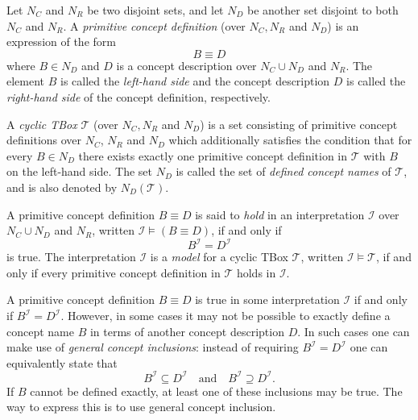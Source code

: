\begin{Definition}
  \label{def:primitive-concept-definitions-cyclic-TBoxes}
  Let $N_C$ and $N_R$ be two disjoint sets, and let $N_D$ be another set disjoint to both
  $N_C$ and $N_R$.  A \emph{primitive concept definition} (over $N_C, N_R$ and $N_D$) is
  an expression of the form
  \begin{equation*}
    B \equiv D
  \end{equation*}
  where $B \in N_D$ and $D$ is a concept description over $N_C \cup N_D$ and $N_R$.  The
  element $B$ is called the \emph{left-hand side} and the concept description $D$ is
  called the \emph{right-hand side} of the concept definition, respectively.

  A \emph{cyclic TBox} $\mathcal{T}$ (over $N_C, N_R$ and $N_D$) is a set consisting of
  primitive concept definitions over $N_C$, $N_R$ and $N_D$ which additionally satisfies
  the condition that for every $B \in N_D$ there exists exactly one primitive concept
  definition in $\mathcal{T}$ with $B$ on the left-hand side.  The set $N_D$ is called the
  set of \emph{defined concept names} of $\mathcal{T}$, and is also denoted by
  $N_D(\mathcal{T})$.

  A primitive concept definition $B \equiv D$ is said to \emph{hold} in an interpretation
  $\mathcal{I}$ over $N_C \cup N_D$ and $N_R$, written $\mathcal{I} \models (B \equiv D)$,
  if and only if
  \begin{equation*}
    B^{\mathcal{I}} = D^{\mathcal{I}}
  \end{equation*}
  is true.  The interpretation $\mathcal{I}$ is a \emph{model} for a cyclic TBox
  $\mathcal{T}$, written $\mathcal{I} \models \mathcal{T}$, if and only if every primitive
  concept definition in $\mathcal{T}$ holds in $\mathcal{I}$.
\end{Definition}

A primitive concept definition $B \equiv D$ is true in some interpretation $\mathcal{I}$
if and only if $B^{\mathcal{I}} = D^{\mathcal{I}}$.  However, in some cases it may not be
possible to exactly define a concept name $B$ in terms of another concept description $D$.
In such cases one can make use of \emph{general concept inclusions}: instead of requiring
$B^{\mathcal{I}} = D^{\mathcal{I}}$ one can equivalently state that
\begin{equation*}
  B^{\mathcal{I}} \subseteq D^{\mathcal{I}} \quad\text{and}\quad B^{\mathcal{I}} \supseteq D^{\mathcal{I}}.
\end{equation*}
If $B$ cannot be defined exactly, at least one of these inclusions may be true.  The way
to express this is to use general concept inclusion.

